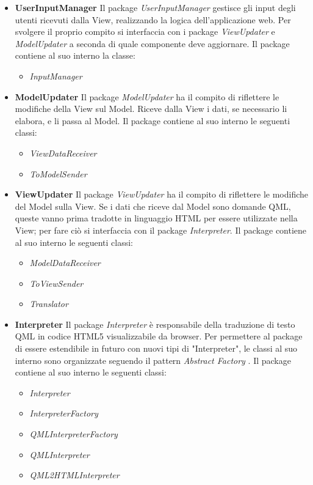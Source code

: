 \documentclass[a4paper,11pt]{article}
\begin{document}
	\begin{itemize}
	\item \textbf{UserInputManager}
	Il package \emph{UserInputManager} gestisce gli input degli utenti ricevuti dalla View, realizzando la logica dell'applicazione web. Per svolgere il proprio compito si interfaccia con i package \emph{ViewUpdater} e \emph{ModelUpdater} a seconda di quale componente deve aggiornare. Il package contiene al suo interno la classe:
	\begin{itemize}
		\item \textit{InputManager}
	\end{itemize}
	
	\item \textbf{ModelUpdater}
	Il package \emph{ModelUpdater} ha il compito di riflettere le modifiche della View sul Model. Riceve dalla View i dati, se necessario li elabora, e li passa al Model. Il package contiene al suo interno le seguenti classi:
	\begin{itemize}
		\item \textit{ViewDataReceiver}
		\item \textit{ToModelSender}
	\end{itemize}
	\item \textbf{ViewUpdater}
	Il package \emph{ViewUpdater} ha il compito di riflettere le modifiche del Model sulla View. Se i dati che riceve dal Model sono domande QML, queste vanno prima tradotte in linguaggio HTML per essere utilizzate nella View; per fare ciò si interfaccia con il package \emph{Interpreter}. Il package contiene al suo interno le seguenti classi:
	\begin{itemize}
		\item \textit{ModelDataReceiver}
		\item \textit{ToViewSender}
		\item \textit{Translator}
	\end{itemize}
	\newpage
	\item \textbf{Interpreter}
	Il package \emph{Interpreter} è responsabile della traduzione di testo QML in codice HTML5 visualizzabile da browser. Per permettere al package di essere estendibile in futuro con nuovi tipi di "Interpreter", le classi al suo interno sono organizzate seguendo il pattern \emph{Abstract Factory} . Il package contiene al suo interno le seguenti classi:
	\begin{itemize}
	\item \textit{Interpreter}
	\item \textit{InterpreterFactory}
	\item \textit{QMLInterpreterFactory}
	\item \textit{QMLInterpreter}
	\item \textit{QML2HTMLInterpreter}
	\end{itemize}
	
	\end{itemize}		
\end{document}
